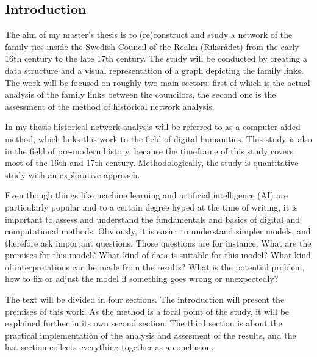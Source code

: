\documentclass[a4paper,12pt]{article}
\begin{document}
\begin{onehalfspace} %
\section{Introduction}
The aim of my master's thesis is to (re)construct and study a network of the family ties inside the Swedish Council of the Realm (Riksrådet) from the early 16th century to the late 17th century. The study will be conducted by creating a data structure and a visual representation of a graph depicting the family links. The work will be focused on roughly two main sectors: first of which is the actual analysis of the family links between the councilors, the second one is the assessment of the method of historical network analysis. 

In my thesis historical network analysis will be referred to as a computer-aided method, which links this work to the field of digital humanities. This study is also in the field of pre-modern history, because the timeframe of this study covers most of the 16th and 17th century. Methodologically, the study is quantitative study with an explorative approach.

Even though things like machine learning and artificial intelligence (AI) are particularly popular and to a certain degree hyped at the time of writing, it is important to assess and understand the fundamentals and basics of digital and computational methods. Obviously, it is easier to understand simpler models, and therefore ask important questions. Those questions are for instance: What are the premises for this model? What kind of data is suitable for this model? What kind of interpretations can be made from the results? What is the potential problem, how to fix or adjust the model if something goes wrong or unexpectedly?

The text will be divided in four sections. The introduction will present the premises of this work. As the method is a focal point of the study, it will be explained further in its own second section. The third section is about the practical implementation of the analysis and assesment of the results, and the last section collects everything together as a conclusion. 


\end{onehalfspace}
\end{document}
